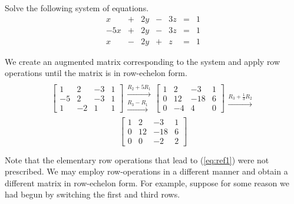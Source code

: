 \documentclass{ximera}
\begin{document}
\begin{exploration}\label{init:gaussianelim1}
Solve the following system of equations.
$$\begin{array}{ccccccccc}
      x &+ &2y&-&3z&= &1 \\
	 -5x& +&2y&-&3z&=&1\\
      x&- &2y&+&z&=&1
    \end{array}$$

We create an augmented matrix corresponding to the system and apply row operations until the matrix is in row-echelon form.  
$$\left[\begin{array}{ccc|c}  
 1&2&-3&1\\-5&2&-3&1\\1&-2&1&1
 \end{array}\right]
 \begin{array}{c}
 \\
 \xrightarrow{R_2+5R_1}\\
 \xrightarrow{R_3-R_1}\\
 \end{array}
\left[\begin{array}{ccc|c}  
 1&2&-3&1\\0&12&-18&6\\0&-4&4&0
 \end{array}\right]
 \begin{array}{c}
 \\
 \\
 \xrightarrow{R_3+\frac{1}{3}R_2}\\
 \end{array}$$
 \begin{equation}\label{eq:ref1}
 \left[\begin{array}{ccc|c}  
 1&2&-3&1\\0&12&-18&6\\0&0&-2&2
 \end{array}\right]
\end{equation}

Note that the elementary row operations that lead to (\ref{eq:ref1}) were not prescribed.  We may employ row-operations in a different manner and obtain a different matrix in row-echelon form.  For example, suppose for some reason we had begun by switching the first and third rows.


\end{exploration}
\end{document}

